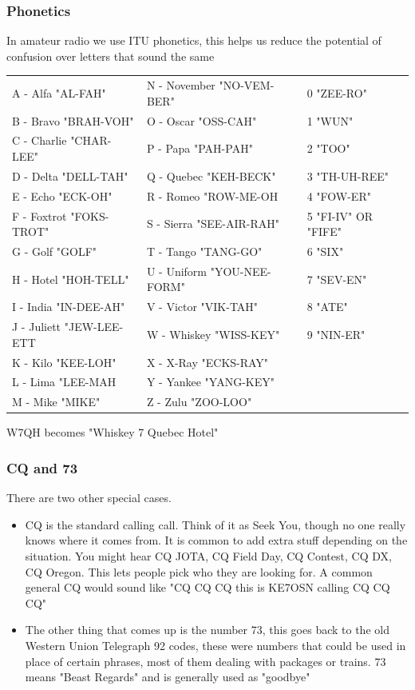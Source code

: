 \documentclass[10pt]{beamer}
\begin{document}
\begin{frame}
\frametitle{Phonetics}
In amateur radio we use ITU phonetics, this helps us reduce the potential of confusion over letters that sound the same
\begin{tabular}{l l l}
\scriptsize A - Alfa "AL-FAH"& \scriptsize  N - November "NO-VEM-BER" & \scriptsize  0 "ZEE-RO"\\
\scriptsize B - Bravo "BRAH-VOH"& \scriptsize  O - Oscar "OSS-CAH" & \scriptsize  1 "WUN"\\
\scriptsize C - Charlie "CHAR-LEE"& \scriptsize  P - Papa "PAH-PAH" & \scriptsize  2 "TOO"\\
\scriptsize D - Delta "DELL-TAH"& \scriptsize  Q - Quebec "KEH-BECK" & \scriptsize  3 "TH-UH-REE"\\
\scriptsize E - Echo "ECK-OH"& \scriptsize  R - Romeo "ROW-ME-OH & \scriptsize  4 "FOW-ER"\\
\scriptsize F - Foxtrot "FOKS-TROT"& \scriptsize  S - Sierra "SEE-AIR-RAH" & \scriptsize  5 "FI-IV" OR "FIFE"\\
\scriptsize G - Golf "GOLF"& \scriptsize  T - Tango "TANG-GO" & \scriptsize  6 "SIX"\\
\scriptsize H - Hotel "HOH-TELL"& \scriptsize  U - Uniform "YOU-NEE-FORM" & \scriptsize  7 "SEV-EN"\\
\scriptsize I - India "IN-DEE-AH"& \scriptsize  V - Victor "VIK-TAH" & \scriptsize  8 "ATE"\\
\scriptsize J - Juliett "JEW-LEE-ETT& \scriptsize  W - Whiskey "WISS-KEY" & \scriptsize  9 "NIN-ER"\\
\scriptsize K - Kilo "KEE-LOH"& \scriptsize  X - X-Ray "ECKS-RAY"\\
\scriptsize L - Lima "LEE-MAH& \scriptsize  Y - Yankee "YANG-KEY"\\
\scriptsize M - Mike "MIKE"& \scriptsize  Z - Zulu "ZOO-LOO"\\
\end{tabular}
W7QH becomes "Whiskey 7 Quebec Hotel" 
\end{frame}

\begin{frame}
\frametitle{CQ and 73}
There are two other special cases.
\begin{itemize}
\item CQ is the standard calling call. Think of it as Seek You, though no one really knows where it comes from. It is common to add extra stuff depending on the situation. You might hear CQ JOTA, CQ Field Day, CQ Contest, CQ DX, CQ Oregon. This lets people pick who they are looking for. A common general CQ would sound like "CQ CQ CQ this is KE7OSN calling CQ CQ CQ"
\item The other thing that comes up is the number 73, this goes back to the old Western Union Telegraph 92 codes, these were numbers that could be used in place of certain phrases, most of them dealing with packages or trains. 73 means "Beast Regards" and is generally used as "goodbye"
\end{itemize}
\end{frame}
\end{document}
